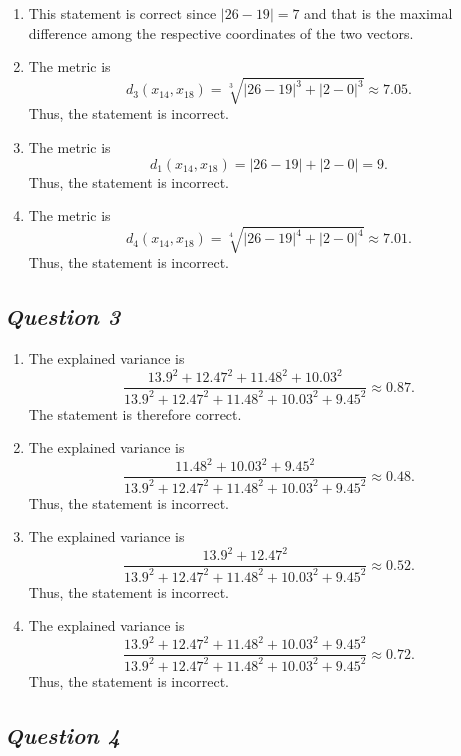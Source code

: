 \documentclass[twoside,11pt]{article}
\makeatletter
\let\@oldsubsection\subsection
\renewcommand\subsection[1]{\@oldsubsection*{\textit{#1}}}
\makeatother
\begin{document}
\begin{enumerate}[label=\Alph*.]
	\item This statement is correct since \(|26 - 19| = 7\) and that is the maximal difference among the respective coordinates of the two vectors.

	\item The metric is
	\[
		d_3(x_{14}, x_{18}) = \sqrt[3]{|26 - 19|^3 + |2 - 0|^3} \approx 7.05.
	\]
	Thus, the statement is incorrect.

	\item The metric is
	\[
		d_1(x_{14}, x_{18}) = |26 - 19| + |2 - 0| = 9.
	\]
	Thus, the statement is incorrect.

	\item The metric is
	\[
		d_4(x_{14}, x_{18}) = \sqrt[4]{|26 - 19|^4 + |2 - 0|^4} \approx 7.01.
	\]
	Thus, the statement is incorrect.

\end{enumerate}

\subsection{Question 3}

\begin{enumerate}[label=\Alph*.]
	\item The explained variance is
	\[
		\frac{13.9^2 + 12.47^2 + 11.48^2 + 10.03^2}{13.9^2 + 12.47^2 + 11.48^2 + 10.03^2 + 9.45^2} \approx 0.87.
	\]
	The statement is therefore correct.

	\item The explained variance is
	\[
		\frac{11.48^2 + 10.03^2 + 9.45^2}{13.9^2 + 12.47^2 + 11.48^2 + 10.03^2 + 9.45^2} \approx 0.48.
	\]
	Thus, the statement is incorrect.

	\item The explained variance is
	\[
		\frac{13.9^2 + 12.47^2}{13.9^2 + 12.47^2 + 11.48^2 + 10.03^2 + 9.45^2} \approx 0.52.
	\]
	Thus, the statement is incorrect.

	\item The explained variance is
	\[
		\frac{13.9^2 + 12.47^2 + 11.48^2 + 10.03^2 + 9.45^2}{13.9^2 + 12.47^2 + 11.48^2 + 10.03^2 + 9.45^2} \approx 0.72.
	\]
	Thus, the statement is incorrect.

\end{enumerate}

\subsection{Question 4}
\end{document}
